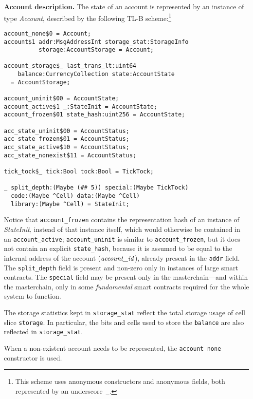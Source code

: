 \documentclass[12pt,oneside]{article}
\def\makepoint#1{\medbreak\noindent{\bf #1.\ }}
\def\nxsubpoint{\refstepcounter{subsubsection}%
  \smallbreak\makepoint{\thesubsubsection}}
\def\emb#1{\textbf{#1.}}
\let\vr=\textit
\def\accountid{\vr{account\_id\/}}
\begin{document}
\nxsubpoint\label{sp:acc.descr}\emb{Account description}
The state of an account is represented by an instance of type {\em Account}, described by the following TL-B scheme:\footnote{This scheme uses anonymous constructors and anonymous fields, both represented by an underscore~{\tt \_}.}
\begin{verbatim}
account_none$0 = Account;
account$1 addr:MsgAddressInt storage_stat:StorageInfo
          storage:AccountStorage = Account;

account_storage$_ last_trans_lt:uint64
    balance:CurrencyCollection state:AccountState 
  = AccountStorage;

account_uninit$00 = AccountState;
account_active$1 _:StateInit = AccountState;
account_frozen$01 state_hash:uint256 = AccountState;

acc_state_uninit$00 = AccountStatus;
acc_state_frozen$01 = AccountStatus;
acc_state_active$10 = AccountStatus;
acc_state_nonexist$11 = AccountStatus;

tick_tock$_ tick:Bool tock:Bool = TickTock;

_ split_depth:(Maybe (## 5)) special:(Maybe TickTock)
  code:(Maybe ^Cell) data:(Maybe ^Cell)
  library:(Maybe ^Cell) = StateInit;
\end{verbatim}
Notice that {\tt account\_frozen} contains the representation hash of an instance of {\em StateInit}, instead of that instance itself, which would otherwise be contained in an {\tt account\_active}; {\tt account\_uninit} is similar to {\tt account\_frozen}, but it does not contain an explicit {\tt state\_hash}, because it is assumed to be equal to the internal address of the account ($\accountid$), already present in the \texttt{addr} field. The {\tt split\_depth} field is present and non-zero only in instances of large smart contracts. The {\tt special} field may be present only in the masterchain---and within the masterchain, only in some {\em fundamental\/} smart contracts required for the whole system to function.

The storage statistics kept in {\tt storage\_stat} reflect the total storage usage of cell slice {\tt storage}. In particular, the bits and cells used to store the {\tt balance} are also reflected in {\tt storage\_stat}.

When a non-existent account needs to be represented, the {\tt account\_none} constructor is used.
\end{document}
